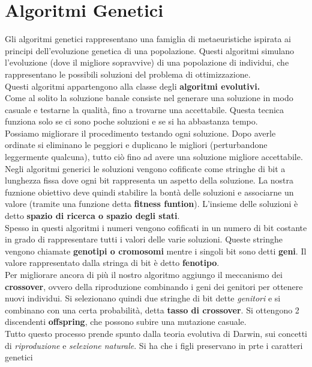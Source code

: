 \message{ !name(ro.tex)}\documentclass[a4paper,12pt, oneside]{book}
\begin{document}
\section{Algoritmi Genetici}
Gli algoritmi genetici rappresentano una famiglia di metaeuristiche
ispirata ai principi dell'evoluzione genetica di una
popolazione. Questi algoritmi simulano l'evoluzione (dove il migliore
sopravvive) di una popolazione di individui, che rappresentano le
possibili soluzioni del problema di ottimizzazione.\\
Questi algoritmi appartengono alla classe degli \textbf{algoritmi
  evolutivi.}\\
Come al solito la soluzione banale consiste nel generare una soluzione
in modo casuale e testarne la qualità, fino a trovarne una
accettabile. Questa tecnica funziona solo se ci sono poche soluzioni e
se si ha abbastanza tempo.\\
Possiamo migliorare il procedimento testando ogni soluzione. Dopo
averle ordinate si eliminano le peggiori e duplicano le migliori
(perturbandone leggermente qualcuna), tutto ciò fino ad avere una
soluzione migliore accettabile.\\
Negli algoritmi generici le soluzioni vengono cofificate come stringhe
di bit a lunghezza fissa dove ogni bit rappresenta un aspetto della
soluzione. La nostra fuznione obiettivo deve quindi stabilire la bontà
delle soluzioni e associarne un valore (tramite una funzione detta
\textbf{fitness funtion}). L'insieme delle soluzioni è
detto \textbf{spazio di ricerca o spazio degli stati}.\\
Spesso in questi algoritmi i numeri vengono cofificati in un numero di
bit costante in grado di rappresentare tutti i valori delle varie
soluzioni. Queste stringhe vengono chiamate \textbf{genotipi o
  cromosomi} mentre i singoli bit sono detti \textbf{geni}. Il valore
rappresentato dalla stringa di bit è detto \textbf{fenotipo}.\\
Per migliorare ancora di più il nostro algoritmo aggiungo il
meccanismo dei \textbf{crossover}, ovvero della riproduzione
combinando i geni dei genitori per ottenere nuovi individui. Si
selezionano quindi due stringhe di bit dette \textit{genitori} e si
combinano con una certa probabilità, detta \textbf{tasso di
  crossover}. Si ottengono 2 discendenti \textbf{offspring}, che
possono subire una mutazione casuale.\\
Tutto questo processo prende spunto dalla teoria evolutiva di Darwin,
sui concetti di \textit{riproduzione} e \textit{selezione
  naturale}. Si ha che i figli preservano in prte i caratteri genetici
\end{document}
